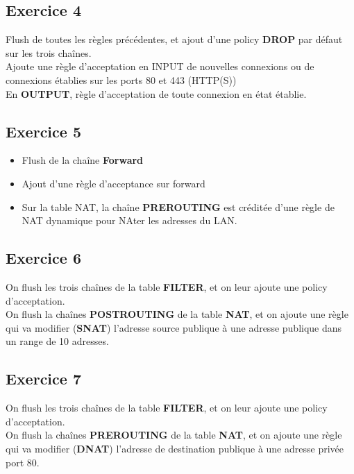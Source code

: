 \documentclass[a4paper,10pt,final,fleqn]{article}
\begin{document}
		\subsection{Exercice 4}

			Flush de toutes les règles précédentes, et ajout d'une policy \textbf{DROP} par défaut sur les trois chaînes.\\
			Ajoute une règle d'acceptation en INPUT de nouvelles connexions ou de connexions établies sur les ports 80 et 443 (HTTP(S))\\
			En \textbf{OUTPUT}, règle d'acceptation de toute connexion en état établie.\\

		\subsection{Exercice 5}

			\begin{itemize}
				\item Flush de la chaîne \textbf{Forward}
				\item Ajout d'une règle d'acceptance sur forward
				\item Sur la table NAT, la chaîne \textbf{PREROUTING} est créditée d'une règle de NAT dynamique pour NAter les adresses du LAN.
			\end{itemize}

		\subsection{Exercice 6}

			On flush les trois chaînes de la table \textbf{FILTER}, et on leur ajoute une policy d'acceptation.\\
			On flush la chaînes \textbf{POSTROUTING} de la table \textbf{NAT}, et on ajoute une règle qui va modifier (\textbf{SNAT}) l'adresse source publique à une adresse publique dans un range de 10 adresses.\\

		\subsection{Exercice 7}

			On flush les trois chaînes de la table \textbf{FILTER}, et on leur ajoute une policy d'acceptation.\\
			On flush la chaînes \textbf{PREROUTING} de la table \textbf{NAT}, et on ajoute une règle qui va modifier (\textbf{DNAT}) l'adresse de destination publique à une adresse privée port 80.\\
\end{document}
